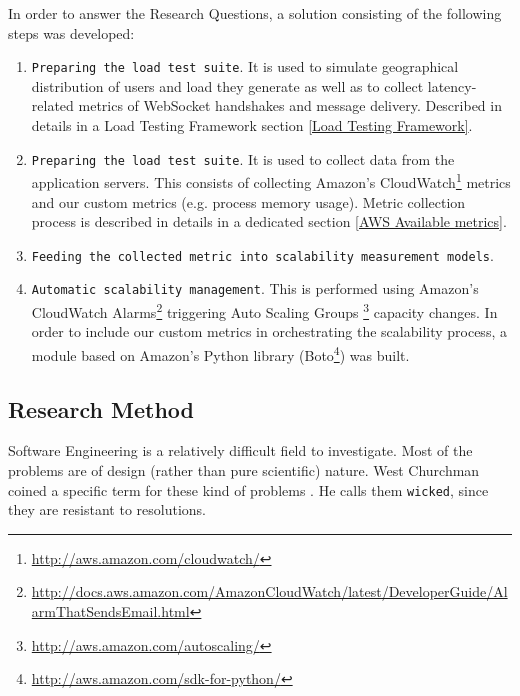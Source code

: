 \documentclass{uvamscse}
\begin{document}
In order to answer the Research Questions, a solution consisting of the following steps was developed:
\begin{enumerate}
  \item \texttt{Preparing the load test suite}. It is used to simulate geographical distribution of users and load they generate as well as to collect latency-related metrics of WebSocket handshakes and message delivery. Described in details in a Load Testing Framework section \ref{Load Testing Framework}.
  \item \texttt{Preparing the load test suite}. It is used to collect data from the application servers. This consists of collecting Amazon's CloudWatch\footnote{\url{http://aws.amazon.com/cloudwatch/}} metrics and our custom metrics (e.g. process memory usage). Metric collection process is described in details in a dedicated section \ref{AWS Available metrics}.
  \item \texttt{Feeding the collected metric into scalability measurement models}.
  \item \texttt{Automatic scalability management}. This is performed using Amazon's CloudWatch Alarms\footnote{\url{http://docs.aws.amazon.com/AmazonCloudWatch/latest/DeveloperGuide/AlarmThatSendsEmail.html}} triggering Auto Scaling Groups \footnote{\url{http://aws.amazon.com/autoscaling/}} capacity changes. In order to include our custom metrics in orchestrating the scalability process, a module based on Amazon's Python library (Boto\footnote{\url{http://aws.amazon.com/sdk-for-python/}}) was built.
\end{enumerate}

\subsection{Research Method}
Software Engineering is a relatively difficult field to investigate. Most of the problems are of design (rather than pure scientific) nature. West Churchman coined a specific term for these kind of problems \cite{Wckd}. He calls them \texttt{wicked}, since they are resistant to resolutions.
\end{document}
